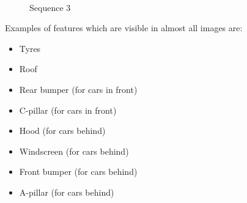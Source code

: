 \documentclass[11pt, a4paper]{amsart}
\begin{document}
\begin{figure}[H]
		\label{S3F71}
		\\
		\label{S3F108}
		\quad
		\caption{Sequence 3}
		\label{S3}
	\end{figure}

	Examples of features which are visible in almost all images are:
	\begin{itemize}
		\item Tyres
		\item Roof
		\item Rear bumper (for cars in front)
		\item C-pillar (for cars in front)
		\item Hood (for cars behind)
		\item Windscreen (for cars behind)
		\item Front bumper (for cars behind)
		\item A-pillar (for cars behind)
	\end{itemize}
\end{document}
